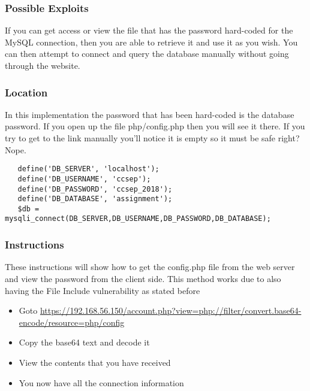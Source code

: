 \documentclass[titlepage]{article}
\begin{document}

      \subsubsection{Possible Exploits} %
      \label{ssub:hard-coded_passwords_possible_exploits}
      
      If you can get access or view the file that has the password hard-coded for the MySQL connection, then you are able to retrieve it and use it as you wish. You can then attempt to connect and query the database manually without going through the website.


      \subsubsection{Location} %
      \label{ssub:hard-coded_passwords_location}
      
      In this implementation the password that has been hard-coded is the database password. If you open up the file php/config.php then you will see it there. If you try to get to the link manually you'll notice it is empty so it must be safe right? Nope.

      \begin{lstlisting}
   define('DB_SERVER', 'localhost');
   define('DB_USERNAME', 'ccsep');
   define('DB_PASSWORD', 'ccsep_2018');
   define('DB_DATABASE', 'assignment');
   $db = mysqli_connect(DB_SERVER,DB_USERNAME,DB_PASSWORD,DB_DATABASE);
      \end{lstlisting}



      \subsubsection{Instructions} %
      \label{ssub:hard-coded_passwords_instructions}
      
      These instructions will show how to get the config.php file from the web server and view the password from the client side. This method works due to also having the File Include vulnerability as stated before

      \begin{itemize}
         \item Goto \url{https://192.168.56.150/account.php?view=php://filter/convert.base64-encode/resource=php/config}
         \item Copy the base64 text and decode it
         \item View the contents that you have received
         \item You now have all the connection information
      \end{itemize}
\end{document}
